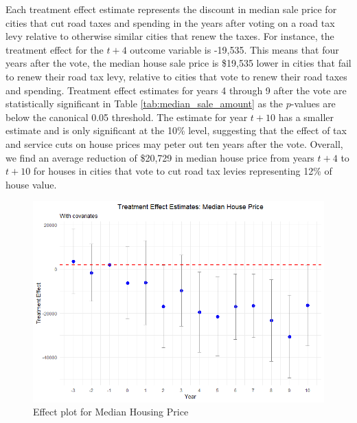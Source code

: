 Each treatment effect estimate represents the discount in median sale price for cities that cut road taxes and spending in the years after voting on a road tax levy relative to otherwise similar cities that renew the taxes. For instance, the treatment effect for the $t + 4$ outcome variable is -19,535.  This means that four years after the vote, the median house sale price is \$19,535 lower in cities that fail to renew their road tax levy, relative to cities that vote to renew their road taxes and spending. Treatment effect estimates for years 4 through 9 after the vote are statistically significant in Table \ref{tab:median_sale_amount} as the $p$-values are below the canonical 0.05 threshold.  The estimate for year $t + 10$ has a smaller estimate and is only significant at the 10\% level, suggesting that the effect of tax and service cuts on house prices may peter out ten years after the vote. Overall, we find an average reduction of \$20,729 in median house price from years $t+4$ to $t+10$ for houses in cities that vote to cut road tax levies representing 12\% of house value.

\begin{figure}[htbp]
    \centering
    \includegraphics[width=\textwidth,keepaspectratio]{images/tes_gs_re.png}    
    \caption{Effect plot for Median Housing Price}
    \label{fig:tes_hp}
\end{figure}

